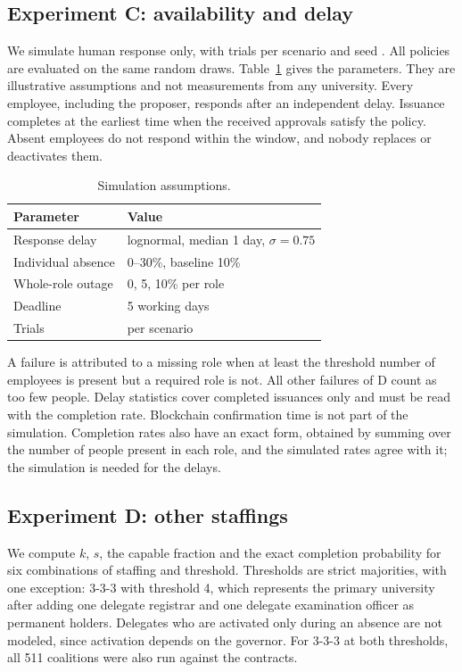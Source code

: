 \subsection{Experiment C: availability and delay}
We simulate human response only, with \Trials{} trials per scenario and seed \Seed{}. All policies are evaluated on the same random draws. Table~\ref{tab:assumptions} gives the parameters. They are illustrative assumptions and not measurements from any university. Every employee, including the proposer, responds after an independent delay. Issuance completes at the earliest time when the received approvals satisfy the policy. Absent employees do not respond within the window, and nobody replaces or deactivates them.

\begin{table}[t]
\centering\small
\caption{Simulation assumptions.}
\label{tab:assumptions}
\begin{tabular}{ll}
\toprule
Parameter & Value\\
\midrule
Response delay & lognormal, median 1 day, $\sigma=0.75$\\
Individual absence & 0--30\%, baseline 10\%\\
Whole-role outage & 0, 5, 10\% per role\\
Deadline & 5 working days\\
Trials & \Trials{} per scenario\\
\bottomrule
\end{tabular}
\end{table}

A failure is attributed to a missing role when at least the threshold number of employees is present but a required role is not. All other failures of D count as too few people. Delay statistics cover completed issuances only and must be read with the completion rate. Blockchain confirmation time is not part of the simulation. Completion rates also have an exact form, obtained by summing over the number of people present in each role, and the simulated rates agree with it; the simulation is needed for the delays.

\subsection{Experiment D: other staffings}
We compute $k$, $s$, the capable fraction and the exact completion probability for six combinations of staffing and threshold. Thresholds are strict majorities, with one exception: 3-3-3 with threshold 4, which represents the primary university after adding one delegate registrar and one delegate examination officer as permanent holders. Delegates who are activated only during an absence are not modeled, since activation depends on the governor. For 3-3-3 at both thresholds, all 511 coalitions were also run against the contracts.

